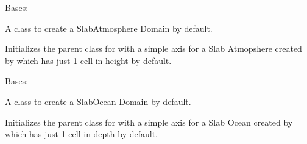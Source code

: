 \documentclass[letterpaper,10pt,english]{sphinxmanual}
\begin{document}

\begin{fulllineitems}
\label{api/climlab.domain:climlab.domain.domain.SlabAtmosphere}
Bases: {\hyperref[api/climlab.domain:climlab.domain.domain.Atmosphere]{\emph{}}}

A class to create a SlabAtmosphere Domain by default.

Initializes the parent {\hyperref[api/climlab.domain:climlab.domain.domain.Atmosphere]{\emph{}}} class for with a simple axis for a
Slab Atmopshere created by {\hyperref[api/climlab.domain:climlab.domain.domain.make_slabatm_axis]{\emph{}}} which has just 1 cell 
in height by default.

\end{fulllineitems}


\begin{fulllineitems}
\label{api/climlab.domain:climlab.domain.domain.SlabOcean}
Bases: {\hyperref[api/climlab.domain:climlab.domain.domain.Ocean]{\emph{}}}

A class to create a SlabOcean Domain by default.

Initializes the parent {\hyperref[api/climlab.domain:climlab.domain.domain.Ocean]{\emph{}}} class for with a simple axis for a
Slab Ocean created by {\hyperref[api/climlab.domain:climlab.domain.domain.make_slabocean_axis]{\emph{}}} which has just 1 cell 
in depth by default.

\end{fulllineitems}

\end{document}
